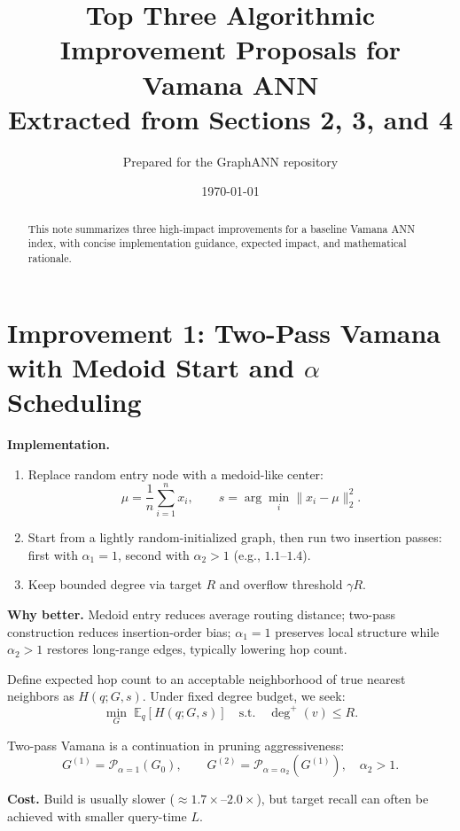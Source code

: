 \documentclass[11pt]{article}
\title{Top Three Algorithmic Improvement Proposals for Vamana ANN\\
\large Extracted from Sections 2, 3, and 4}
\author{Prepared for the GraphANN repository}
\date{\today}
\begin{document}
\maketitle

\begin{abstract}
This note summarizes three high-impact improvements for a baseline Vamana ANN index, with concise implementation guidance, expected impact, and mathematical rationale.
\end{abstract}

\section{Improvement 1: Two-Pass Vamana with Medoid Start and $\alpha$ Scheduling}

\textbf{Implementation.}
\begin{enumerate}
    \item Replace random entry node with a medoid-like center:
    \begin{equation}
    \mu = \frac{1}{n}\sum_{i=1}^n x_i,\qquad s = \arg\min_i \lVert x_i - \mu \rVert_2^2.
    \end{equation}
    \item Start from a lightly random-initialized graph, then run two insertion passes: first with $\alpha_1=1$, second with $\alpha_2>1$ (e.g., $1.1$--$1.4$).
    \item Keep bounded degree via target $R$ and overflow threshold $\gamma R$.
\end{enumerate}

\textbf{Why better.} Medoid entry reduces average routing distance; two-pass construction reduces insertion-order bias; $\alpha_1=1$ preserves local structure while $\alpha_2>1$ restores long-range edges, typically lowering hop count.

Define expected hop count to an acceptable neighborhood of true nearest neighbors as $H(q;G,s)$. Under fixed degree budget, we seek:
\begin{equation}
\min_G\; \mathbb{E}_q[H(q;G,s)]\quad\text{s.t.}\quad \deg^+(v)\le R.
\end{equation}

Two-pass Vamana is a continuation in pruning aggressiveness:
\begin{equation}
G^{(1)} = \mathcal{P}_{\alpha=1}(G_0),\qquad G^{(2)} = \mathcal{P}_{\alpha=\alpha_2}(G^{(1)}),\quad \alpha_2>1.
\end{equation}

\textbf{Cost.} Build is usually slower ($\approx1.7\times$--$2.0\times$), but target recall can often be achieved with smaller query-time $L$.
\end{document}
